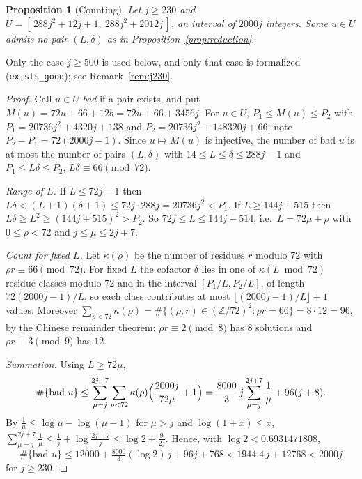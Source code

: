 \documentclass[11pt]{amsart}
\newtheorem{proposition}[theorem]{Proposition}
\theoremstyle{remark}
\newcommand{\Z}{\mathbb{Z}}
\begin{document}
\begin{proposition}[Counting]\label{prop:counting}
Let $j\ge230$ and $U=[\,288j^2+12j+1,\ 288j^2+2012j\,]$, an interval of $2000j$ integers. Some $u\in U$ admits no pair $(L,\delta)$ as in
Proposition~\ref{prop:reduction}.
\end{proposition}

Only the case $j\ge500$ is used below, and only that case is formalized (\texttt{exists\_good}); see Remark~\ref{rem:j230}.

\begin{proof}
Call $u\in U$ \emph{bad} if a pair exists, and put $M(u)=72u+66+12b=72u+66+3456j$. For $u\in U$, $P_1\le M(u)\le P_2$ with
$P_1=20736j^2+4320j+138$ and $P_2=20736j^2+148320j+66$; note $P_2-P_1=72(2000j-1)$. Since $u\mapsto M(u)$ is injective, the number of bad
$u$ is at most the number of pairs $(L,\delta)$ with $14\le L\le\delta\le 288j-1$ and $P_1\le L\delta\le P_2$, $L\delta\equiv66\pmod{72}$.

\emph{Range of $L$.} If $L\le72j-1$ then $L\delta<(L+1)(\delta+1)\le72j\cdot288j=20736j^2<P_1$. If $L\ge144j+515$ then
$L\delta\ge L^2\ge(144j+515)^2>P_2$. So $72j\le L\le144j+514$, i.e.\ $L=72\mu+\rho$ with $0\le\rho<72$ and $j\le\mu\le2j+7$.

\emph{Count for fixed $L$.} Let $\kappa(\rho)$ be the number of residues $r$ modulo $72$ with $\rho r\equiv66\pmod{72}$. For fixed $L$
the cofactor $\delta$ lies in one of $\kappa(L\bmod72)$ residue classes modulo $72$ and in the interval $[P_1/L,P_2/L]$, of length
$72(2000j-1)/L$, so each class contributes at most $\lfloor(2000j-1)/L\rfloor+1$ values. Moreover
$\sum_{\rho<72}\kappa(\rho)=\#\{(\rho,r)\in(\Z/72)^2:\rho r=66\}=8\cdot12=96$, by the Chinese remainder theorem: $\rho r\equiv2\pmod8$
has $8$ solutions and $\rho r\equiv3\pmod 9$ has $12$.

\emph{Summation.} Using $L\ge72\mu$,
\[
  \#\{\text{bad }u\}\le\sum_{\mu=j}^{2j+7}\sum_{\rho<72}\kappa(\rho)\Bigl(\frac{2000j}{72\mu}+1\Bigr)
  =\frac{8000}{3}\,j\sum_{\mu=j}^{2j+7}\frac1\mu+96(j+8).
\]
By $\frac1{\mu}\le\log\mu-\log(\mu-1)$ for $\mu>j$ and $\log(1+x)\le x$,
$\sum_{\mu=j}^{2j+7}\frac1\mu\le\frac1j+\log\frac{2j+7}{j}\le\log2+\frac{9}{2j}$. Hence, with $\log2<0.6931471808$,
\[
  \#\{\text{bad }u\}\le 12000+\tfrac{8000}{3}(\log 2)\,j+96j+768<1944.4\,j+12768<2000j
\]
for $j\ge230$.
\end{proof}
\end{document}
